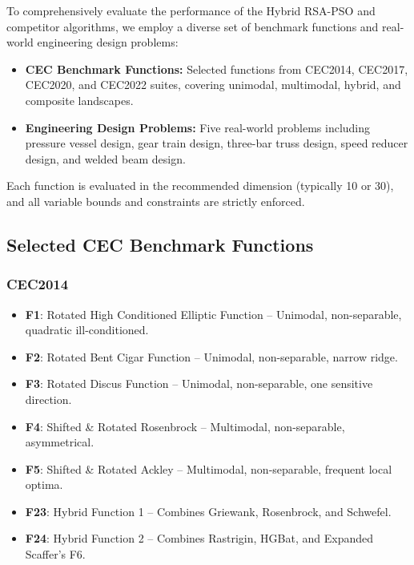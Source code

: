 \documentclass[12pt]{article}
\begin{document}
To comprehensively evaluate the performance of the Hybrid RSA-PSO and competitor algorithms, we employ a diverse set of benchmark functions and real-world engineering design problems:
\begin{itemize}
    \item \textbf{CEC Benchmark Functions:} Selected functions from CEC2014, CEC2017, CEC2020, and CEC2022 suites, covering unimodal, multimodal, hybrid, and composite landscapes.
    \item \textbf{Engineering Design Problems:} Five real-world problems including pressure vessel design, gear train design, three-bar truss design, speed reducer design, and welded beam design.
\end{itemize}
Each function is evaluated in the recommended dimension (typically 10 or 30), and all variable bounds and constraints are strictly enforced.

\subsection{Selected CEC Benchmark Functions}

\subsubsection*{CEC2014}
\begin{itemize}
    \item \textbf{F1}: Rotated High Conditioned Elliptic Function – Unimodal, non-separable, quadratic ill-conditioned.
    \item \textbf{F2}: Rotated Bent Cigar Function – Unimodal, non-separable, narrow ridge.
    \item \textbf{F3}: Rotated Discus Function – Unimodal, non-separable, one sensitive direction.
    \item \textbf{F4}: Shifted \& Rotated Rosenbrock – Multimodal, non-separable, asymmetrical.
    \item \textbf{F5}: Shifted \& Rotated Ackley – Multimodal, non-separable, frequent local optima.
    \item \textbf{F23}: Hybrid Function 1 – Combines Griewank, Rosenbrock, and Schwefel.
    \item \textbf{F24}: Hybrid Function 2 – Combines Rastrigin, HGBat, and Expanded Scaffer’s F6.
\end{itemize}
\end{document}
